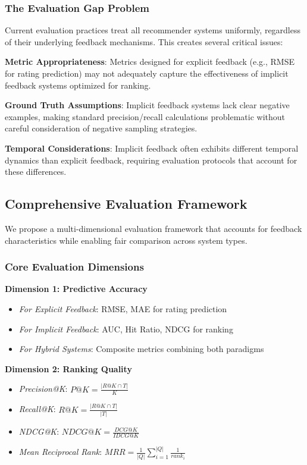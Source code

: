 \subsubsection{The Evaluation Gap Problem}
Current evaluation practices treat all recommender systems uniformly, regardless of their underlying feedback mechanisms. This creates several critical issues:

\textbf{Metric Appropriateness}: Metrics designed for explicit feedback (e.g., RMSE for rating prediction) may not adequately capture the effectiveness of implicit feedback systems optimized for ranking.

\textbf{Ground Truth Assumptions}: Implicit feedback systems lack clear negative examples, making standard precision/recall calculations problematic without careful consideration of negative sampling strategies.

\textbf{Temporal Considerations}: Implicit feedback often exhibits different temporal dynamics than explicit feedback, requiring evaluation protocols that account for these differences.

\subsection{Comprehensive Evaluation Framework}

We propose a multi-dimensional evaluation framework that accounts for feedback characteristics while enabling fair comparison across system types.

\subsubsection{Core Evaluation Dimensions}

\textbf{Dimension 1: Predictive Accuracy}
\begin{itemize}
    \item \textit{For Explicit Feedback}: RMSE, MAE for rating prediction
    \item \textit{For Implicit Feedback}: AUC, Hit Ratio, NDCG for ranking
    \item \textit{For Hybrid Systems}: Composite metrics combining both paradigms
\end{itemize}

\textbf{Dimension 2: Ranking Quality}
\begin{itemize}
    \item \textit{Precision@K}: $P@K = \frac{|R@K \cap T|}{K}$
    \item \textit{Recall@K}: $R@K = \frac{|R@K \cap T|}{|T|}$
    \item \textit{NDCG@K}: $NDCG@K = \frac{DCG@K}{IDCG@K}$
    \item \textit{Mean Reciprocal Rank}: $MRR = \frac{1}{|Q|}\sum_{i=1}^{|Q|}\frac{1}{rank_i}$
\end{itemize}

